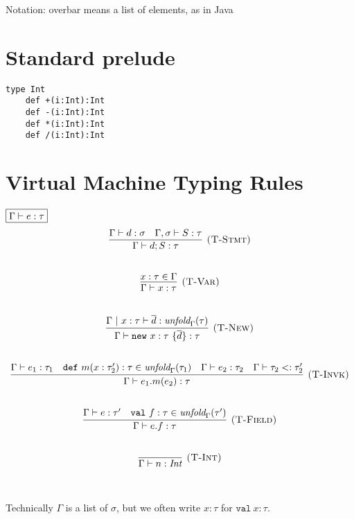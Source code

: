 \documentclass{article}
\newcommand{\keywadj}[1]{\mathtt{#1}}
\newcommand{\keyw}[1]{\keywadj{#1}~}
\begin{document}
Notation: overbar means a list of elements, as in Java




\section{Standard prelude}

\begin{lstlisting}
type Int
    def +(i:Int):Int
    def -(i:Int):Int
    def *(i:Int):Int
    def /(i:Int):Int
\end{lstlisting}

\section{Virtual Machine Typing Rules}

$\fbox{$\Gamma \vdash e : \tau$}$
\[
\begin{array}{c}
\infer[\textsc{(T-Stmt)}]
  {\Gamma \vdash d; S : \tau}
  {\Gamma \vdash d : \sigma & \Gamma, \sigma \vdash S : \tau}\\[5ex]
  
\infer[\textsc{(T-Var)}]
  {\Gamma \vdash x : \tau}
  {x : \tau \in \Gamma}\\[5ex]

\infer[\textsc{(T-New)}]
	{\Gamma \vdash \keywadj{new}~x:\tau~\{\overline{d}\} : \tau}
	{\Gamma ~|~ x:\tau \vdash \overline{d} : \textit{unfold}_\Gamma(\tau)} \\[5ex]

\infer[\textsc{(T-Invk)}]
	{\Gamma \vdash e_1.m(e_2) : \tau} 
	{\Gamma \vdash e_1 : \tau_1  & \keyw{def} m(x:\tau_2'):\tau \in \textit{unfold}_\Gamma(\tau_1) & \Gamma \vdash e_2 : \tau_2 & \Gamma \vdash \tau_2 <: \tau_2'}\\[5ex]

\infer[\textsc{(T-Field)}]
	{\Gamma \vdash e.f : \tau} 
	{\Gamma \vdash e : \tau' & \keyw{val} f : \tau \in \textit{unfold}_\Gamma(\tau')}\\[5ex]

\infer[\textsc{(T-Int)}]
  {\Gamma \vdash n : \textit{Int}}
  {}\\[5ex]

\end{array}
\]

Technically $\Gamma$ is a list of $\sigma$, but we often write $x:\tau$ for $\keyw{val} x:\tau$.
\end{document}

